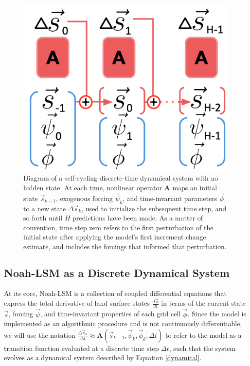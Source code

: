 \begin{figure}[ht]
    \centering

    \includegraphics[width=.66\linewidth]{Figures/schematic_scann.png}

    \caption{Diagram of a self-cycling discrete-time dynamical system with no hidden state. At each time, nonlinear operator \textbf{A} maps an initial state $\vec{s}_{k-1}$, exogenous forcing $\vec{\psi}_k$, and time-invariant parameters $\vec{\phi}$ to a new state $\Delta \vec{s}_k$, used to initialize the subsequent time step, and so forth until $H$ predictions have been made. As a matter of convention, time step zero refers to the first perturbation of the initial state after applying the model's first increment change estimate, and includes the forcings that informed that perturbation.}
    \label{scann}
\end{figure}

\subsection{Noah-LSM as a Discrete Dynamical System}

At its core, Noah-LSM is a collection of coupled differential equations that express the total derivative of land surface states $\frac{d\vec{s}}{dt}$ in terms of the current state $\vec{s}$, forcing $\vec{\psi}$, and time-invariant properties of each grid cell $\vec{\phi}$. Since the model is implemented as an algorithmic procedure and is not continuously differentiable, we will use the notation $\frac{\Delta \vec{s}_k}{\Delta t} \approx \mathbf{A}(\vec{s}_{k-1}, \vec{\psi}_k, \vec{\phi}_k, \Delta t)$ to refer to the model as a transition function evaluated at a discrete time step $\Delta t$, such that the system evolves as a dynamical system described by Equation \ref{dynamical}.

